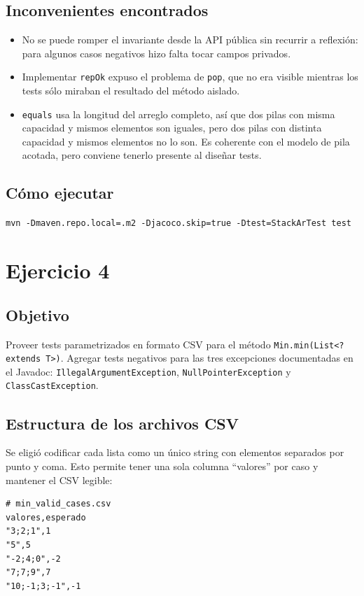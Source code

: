 \documentclass[12pt,a4paper]{article}
\begin{document}
\subsection{Inconvenientes encontrados}
\begin{itemize}
  \item No se puede romper el invariante desde la API pública sin recurrir a reflexión: para algunos casos negativos hizo falta tocar campos privados.
  \item Implementar \texttt{repOk} expuso el problema de \texttt{pop}, que no era visible mientras los tests sólo miraban el resultado del método aislado.
  \item \texttt{equals} usa la longitud del arreglo completo, así que dos pilas con misma capacidad y mismos elementos son iguales, pero dos pilas con distinta capacidad y mismos elementos no lo son. Es coherente con el modelo de pila acotada, pero conviene tenerlo presente al diseñar tests.
\end{itemize}

\subsection{Cómo ejecutar}
\begin{center}
\texttt{mvn -Dmaven.repo.local=.m2 -Djacoco.skip=true -Dtest=StackArTest test}
\end{center}

\section{Ejercicio 4}
\subsection{Objetivo}
Proveer tests parametrizados en formato CSV para el método \texttt{Min.min(List<? extends T>)}. Agregar tests negativos para las tres excepciones documentadas en el Javadoc: \texttt{IllegalArgumentException}, \texttt{NullPointerException} y \texttt{ClassCastException}.

\subsection{Estructura de los archivos CSV}
Se eligió codificar cada lista como un único string con elementos separados por punto y coma. Esto permite tener una sola columna ``valores'' por caso y mantener el CSV legible:

\begin{lstlisting}[style=plain]
# min_valid_cases.csv
valores,esperado
"3;2;1",1
"5",5
"-2;4;0",-2
"7;7;9",7
"10;-1;3;-1",-1
\end{lstlisting}
\end{document}
